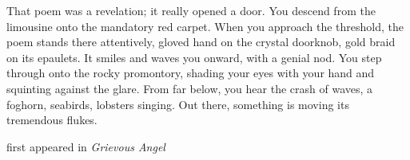 
That poem was a revelation; it really opened a door. You descend from
the limousine onto the mandatory red carpet. When you approach the
threshold, the poem stands there attentively, gloved hand on the crystal
doorknob, gold braid on its epaulets. It smiles and waves you onward,
with a genial nod. You step through onto the rocky promontory, shading
your eyes with your hand and squinting against the glare. From far
below, you hear the crash of waves, a foghorn, seabirds, lobsters
singing. Out there, something is moving its tremendous flukes.

first appeared in \emph{Grievous Angel}
